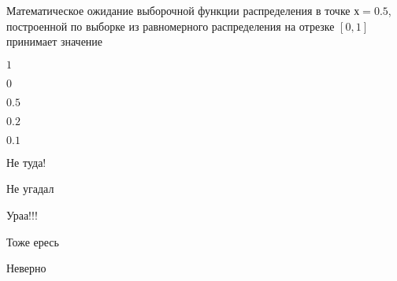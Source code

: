 
\begin{question}
Математическое ожидание выборочной функции распределения в точке
\(х=0.5\), построенной по выборке из равномерного распределения на
отрезке \([0,1]\) принимает значение
\begin{answerlist}
  \item \(1\)
  \item \(0\)
  \item \(0.5\)
  \item \(0.2\)
  \item \(0.1\)
\end{answerlist}
\end{question}

\begin{solution}
\begin{answerlist}
  \item Не туда!
  \item Не угадал
  \item Ураа!!!
  \item Тоже ересь
  \item Неверно
\end{answerlist}
\end{solution}

